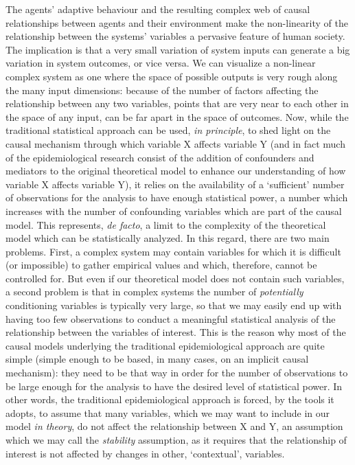 \documentclass[review]{elsarticle}
\begin{document}
The agents' adaptive behaviour and the resulting complex web of causal relationships between agents and their environment make the non-linearity of the relationship between the systems' variables a pervasive feature of human society. The implication is that a very small variation of system inputs can generate a big variation in system outcomes, or vice versa. We can visualize a non-linear complex system as one where the space of possible outputs is very rough along the many input dimensions: because of the number of factors affecting the relationship between any two variables, points that are very near to each other in the space of any input, can be far apart in the space of outcomes. Now, while the traditional statistical approach can be used, \textit{in principle}, to shed light on the causal mechanism through which variable X affects variable Y (and in fact much of the epidemiological research consist of the addition of confounders and mediators to the original theoretical model to enhance our understanding of how variable X affects variable Y), it relies on the availability of a `sufficient' number of observations for the analysis to have enough statistical power, a number which increases with the number of confounding variables which are part of the causal model.
This represents, \textit{de facto}, a limit to the complexity of the theoretical model which can be statistically analyzed. In this regard, there are two main problems. First, a complex system may contain variables for which it is difficult (or impossible) to gather empirical values and which, therefore, cannot be controlled for. But even if our theoretical model does not contain such variables, a second problem is that in complex systems the number of \textit{potentially} conditioning variables is typically very large, so that we may easily end up with having too few observations to conduct a meaningful statistical analysis of the relationship between the variables of interest.
This is the reason why most of the causal models underlying the traditional epidemiological approach are quite simple (simple enough to be based, in many cases, on an implicit causal mechanism): they need to be that way in order for the number of observations to be large enough for the analysis to have the desired level of statistical power. In other words, the traditional epidemiological approach is forced, by the tools it adopts, to assume that many variables, which we may want to include in our model \textit{in theory}, do not affect the relationship between X and Y, an assumption which we may call the \textit{stability} assumption, as it requires that the relationship of interest is not affected by changes in other, `contextual', variables.
\end{document}
